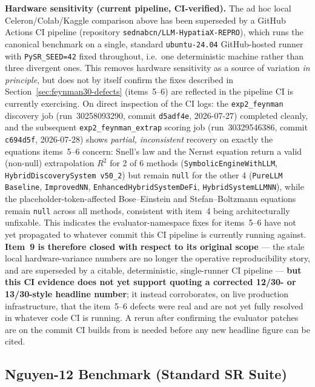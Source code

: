 \documentclass[twoside,11pt]{article}
\newcommand{\Rsq}{R^{2}}
\begin{document}
\textbf{Hardware sensitivity (current pipeline, CI-verified).} The ad hoc
local Celeron/Colab/Kaggle comparison above has been superseded by a
GitHub Actions CI pipeline (repository \texttt{sednabcn/LLM-HypatiaX-REPRO}),
which runs the canonical benchmark on a single, standard
\texttt{ubuntu-24.04} GitHub-hosted runner with \texttt{PySR\_SEED=42} fixed
throughout, i.e.\ one deterministic machine rather than three divergent
ones. This removes hardware sensitivity as a source of variation \emph{in
principle}, but does not by itself confirm the fixes described in
Section~\ref{sec:feynman30-defects} (items~5--6) are reflected in the
pipeline CI is currently exercising. On direct inspection of the CI logs:
the \texttt{exp2\_feynman} discovery job (run~30258093290, commit
\texttt{d5adf4e}, 2026-07-27) completed cleanly, and the subsequent
\texttt{exp2\_feynman\_extrap} scoring job (run~30329546386, commit
\texttt{c694d5f}, 2026-07-28) shows \emph{partial, inconsistent} recovery
on exactly the equations items~5--6 concern: Snell's law and the Nernst
equation return a valid (non-null) extrapolation $\Rsq$ for 2 of 6 methods
(\texttt{SymbolicEngineWithLLM}, \texttt{HybridDiscoverySystem v50\_2}) but
remain \texttt{null} for the other 4 (\texttt{PureLLM Baseline},
\texttt{ImprovedNN}, \texttt{EnhancedHybridSystemDeFi},
\texttt{HybridSystemLLMNN}), while the placeholder-token-affected
Bose--Einstein and Stefan--Boltzmann equations remain \texttt{null} across
all methods, consistent with item~4 being architecturally unfixable. This
indicates the evaluator-namespace fixes for items~5--6 have not yet
propagated to whatever commit this CI pipeline is currently running against.
\textbf{Item~9 is therefore closed with respect to its original scope} ---
the stale local hardware-variance numbers are no longer the operative
reproducibility story, and are superseded by a citable, deterministic,
single-runner CI pipeline --- \textbf{but this CI evidence does not yet
support quoting a corrected 12/30- or 13/30-style headline number}; it
instead corroborates, on live production infrastructure, that the item~5--6
defects were real and are not yet fully resolved in whatever code CI is
running. A rerun after confirming the evaluator patches are on the commit
CI builds from is needed before any new headline figure can be cited.

\subsection{Nguyen-12 Benchmark (Standard SR Suite)}\label{subsec:nguyen12-benchmark-standard-sr-suite}
\label{sec:nguyen12}
\end{document}
